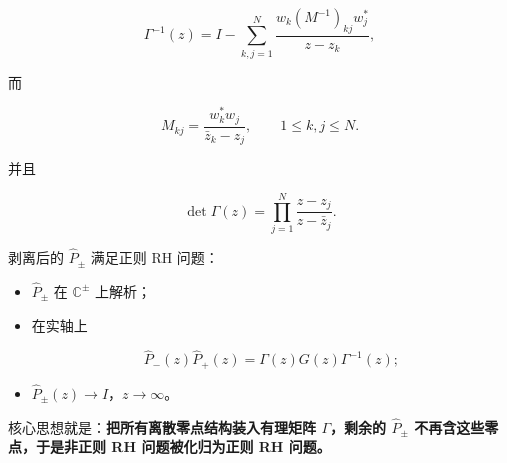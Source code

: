 \documentclass[
    lang=cn,
    scheme=chinese,
    mode=simple,
    device=normal,
    color=blue,
    math=cm,
    thmcnt=section,
    12pt,
    nowatermark
]{elegantbook}
\begin{document}
\begin{equation}
    \Gamma^{-1}(z)
    =
    I-
    \sum\limits_{k,j=1}^{N}
    \dfrac{
        w_k(M^{-1})_{kj}w_j^*
    }{
        z-z_k
    },
    \tag{5.3.17}
    \label{eq:5.3.17}
\end{equation}

而

\[
    M_{kj}
    =
    \dfrac{w_k^*w_j}{\bar z_k-z_j},
    \qquad
    1\le k,j\le N.
\]

并且

\[
    \det\Gamma(z)
    =
    \prod\limits_{j=1}^{N}
    \dfrac{z-z_j}{z-\bar z_j}.
\]

剥离后的 $\widehat P_\pm$ 满足正则 RH 问题：

\begin{itemize}
    \item $\widehat P_\pm$ 在 $\mathbb{C}^\pm$ 上解析；
    \item 在实轴上

          \[
              \widehat P_-(z)\widehat P_+(z)
              =
              \Gamma(z)G(z)\Gamma^{-1}(z);
          \]

    \item $\widehat P_\pm(z)\to I$，$z\to\infty$。
\end{itemize}

核心思想就是：\textbf{把所有离散零点结构装入有理矩阵 $\Gamma$，剩余的 $\widehat P_\pm$ 不再含这些零点，于是非正则 RH 问题被化归为正则 RH 问题。}
\end{document}
